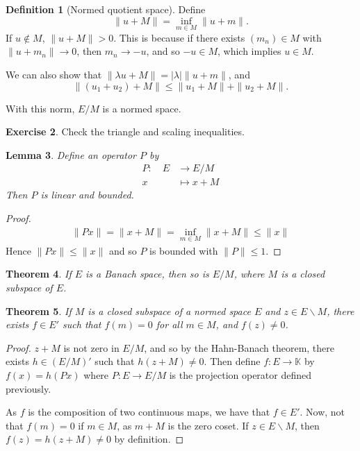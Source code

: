 \documentclass[10pt, oneside, reqno]{amsart}
\theoremstyle{plain}%
\newtheorem{thm}{Theorem}[section]
\newtheorem{lem}[thm]{Lemma}
\numberwithin{equation}{section}
\theoremstyle{definition}
\newtheorem{defn}[thm]{Definition}
\newtheorem{exer}[thm]{Exercise}
\theoremstyle{remark}
\newcommand{\K}{\mathbb{K}}
\newcommand{\mapping}[5]{\begin{align*}
	#1 : \quad     #2 &\rightarrow #3 \\
			#4  &\mapsto #5
\end{align*}	
}
\begin{document}
\begin{defn}[Normed quotient space]
	Define \[
	\| u + M \| = \inf_{m \in M} \| u + m \|. 
	\]  If $u \notin M$, $\| u + M \| > 0$.  This is because if there exists $(m_n) \in M$ with $\| u + m_n \| \rightarrow 0$, then $m_n \rightarrow -u$, and so $-u \in M$, which implies $u \in M$.  

	We can also show that  $\| \lambda u + M \| = |\lambda| \| u + m \|$, and \[
		\| (u_1 + u_2) + M \| \leq \| u_1 + M \| + \| u_2 + M \|.
	\]  

	With this norm, $E/M$ is a normed space.
\end{defn}

\begin{exer}
	Check the triangle and scaling inequalities.
\end{exer}

\begin{lem}
	Define an operator $P$ by \mapping{P}{E}{E/M}{x}{x + M}  Then $P$ is linear and bounded.  
\end{lem}  


\begin{proof}
	\begin{align*}
		\| Px \| = \| x + M \| = \inf_{m \in M} \| x + M \| \leq \| x \|
	\end{align*}  Hence $\| Px \| \leq \| x \|$ and so $P$ is bounded with $\| P \| \leq 1$.  
\end{proof}

\begin{thm}
	If $E$ is a Banach space, then so is $E / M$, where $M$ is a closed subspace of $E$. 
\end{thm}

\begin{thm}
	If $M$ is a closed subspace of a normed space $E$ and $z \in E \backslash M$, there exists $f \in E'$ such that $f(m) = 0$ for all $m \in M$, and $f(z) \neq 0$.  
\end{thm}

\begin{proof}
	$z + M$ is not zero in $E/M$, and so by the Hahn-Banach theorem, there exists $h \in (E/M)'$ such that $h(z+M) \neq 0$.  Then define $f: E \rightarrow \K$ by $f(x) = h(Px)$ where $P : E \rightarrow E/M$ is the projection operator defined previously.
	
	As $f$ is the composition of two continuous maps, we have that $f \in E'$.  Now, not that $f(m) = 0$ if $m \in M$, as $m + M$ is the zero coset.  If $z \in E\backslash M$, then $f(z) = h(z+M) \neq 0$ by definition.         
\end{proof}  
\end{document}
